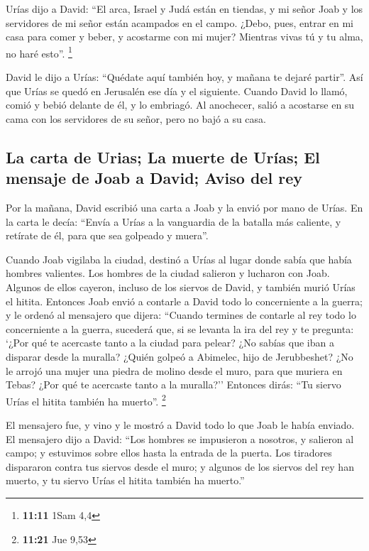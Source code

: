  Urías dijo a David: ``El arca, Israel y Judá están en
tiendas, y mi señor Joab y los servidores de mi señor están acampados en
el campo. ¿Debo, pues, entrar en mi casa para comer y beber, y acostarme
con mi mujer? Mientras vivas tú y tu alma, no haré esto''. \footnote{\textbf{11:11}
  1Sam 4,4}

 David le dijo a Urías: ``Quédate aquí también hoy, y
mañana te dejaré partir''. Así que Urías se quedó en Jerusalén ese día y
el siguiente.  Cuando David lo llamó, comió y bebió
delante de él, y lo embriagó. Al anochecer, salió a acostarse en su cama
con los servidores de su señor, pero no bajó a su casa.

\hypertarget{la-carta-de-urias-la-muerte-de-uruxedas-el-mensaje-de-joab-a-david-aviso-del-rey}{%
\subsection{La carta de Urias; La muerte de Urías; El mensaje de Joab a
David; Aviso del
rey}\label{la-carta-de-urias-la-muerte-de-uruxedas-el-mensaje-de-joab-a-david-aviso-del-rey}}

 Por la mañana, David escribió una carta a Joab y la
envió por mano de Urías.  En la carta le decía: ``Envía a
Urías a la vanguardia de la batalla más caliente, y retírate de él, para
que sea golpeado y muera''.

 Cuando Joab vigilaba la ciudad, destinó a Urías al lugar
donde sabía que había hombres valientes.  Los hombres de
la ciudad salieron y lucharon con Joab. Algunos de ellos cayeron,
incluso de los siervos de David, y también murió Urías el hitita.
 Entonces Joab envió a contarle a David todo lo
concerniente a la guerra;  y le ordenó al mensajero que
dijera: ``Cuando termines de contarle al rey todo lo concerniente a la
guerra,  sucederá que, si se levanta la ira del rey y te
pregunta: `¿Por qué te acercaste tanto a la ciudad para pelear? ¿No
sabías que iban a disparar desde la muralla?  ¿Quién
golpeó a Abimelec, hijo de Jerubbeshet? ¿No le arrojó una mujer una
piedra de molino desde el muro, para que muriera en Tebas? ¿Por qué te
acercaste tanto a la muralla?'' Entonces dirás: ``Tu siervo Urías el
hitita también ha muerto''. \footnote{\textbf{11:21} Jue 9,53}

 El mensajero fue, y vino y le mostró a David todo lo que
Joab le había enviado.  El mensajero dijo a David: ``Los
hombres se impusieron a nosotros, y salieron al campo; y estuvimos sobre
ellos hasta la entrada de la puerta.  Los tiradores
dispararon contra tus siervos desde el muro; y algunos de los siervos
del rey han muerto, y tu siervo Urías el hitita también ha muerto.''


